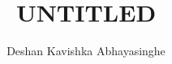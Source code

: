 \documentclass[11pt,a4paper,hyperpdf,oneside,nobind]{AJBthesis}
\title{\texorpdfstring{UNTITLED}{UNTITLED}}
\author{Deshan Kavishka Abhayasinghe}
\begin{document}
\begin{frontmatter}
    
\end{frontmatter}

\begin{mainmatter}
    \linenumbers
\end{mainmatter}

\clearpage

\begin{backmatter}
     
     
        
\end{backmatter}

\let\svaddcontentsline\addcontentsline
    \renewcommand\addcontentsline[3]{%
        \edef\qtest{#1}%
        \def\qmatch{lof}%
        \ifx\qmatch\qtest\else%
            \def\qmatch{lot}%
            \ifx\qmatch\qtest\else%
                \svaddcontentsline{#1}{#2}{#3}%
        \fi\fi%
    }

\begin{appendices}
\end{appendices}
\end{document}
